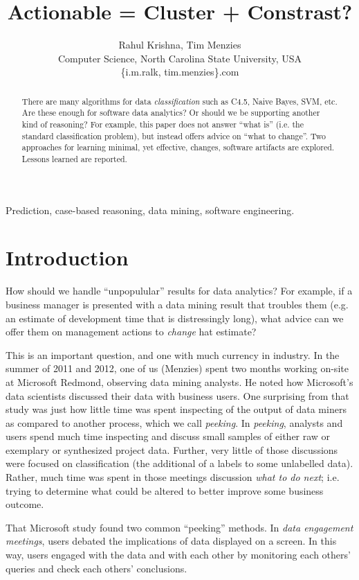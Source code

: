 \documentclass[conference]{IEEEtran}
\title{Actionable = Cluster + Constrast?}
\author{Rahul Krishna, Tim Menzies\\
	Computer Science, North Carolina State University, USA\\
	\{i.m.ralk, tim.menzies\}\@gmail.com
	
}
\begin{document}
	\maketitle
	\begin{abstract}
		There are many
		algorithms for data {\em classification} such as  C4.5, Naive Bayes, SVM, etc.
		Are these enough for software data analytics? Or should we be supporting
		another kind of reasoning? For example, this paper does not answer 
		``what is'' (i.e. the standard classification problem), but instead  offers advice on ``what to change''.
		Two approaches for learning minimal, yet effective,  changes,  software
		artifacts are explored. Lessons learned are reported.
	\end{abstract}
	\begin{IEEEkeywords}
		Prediction, case-based reasoning, data mining, software engineering.
	\end{IEEEkeywords}
	
	\section{Introduction} 
	How should we handle ``unpopulular'' results
	for data analytics? For example, if a business manager is presented
	with a data mining result that troubles them (e.g. an estimate of
	development time that is distressingly long), what advice
	can we offer them on management actions to {\em change} hat estimate?
	
	This is an important question, and one with much currency in industry.
	In the summer of 2011 and 2012, one of us (Menzies) spent two months
	working on-site at Microsoft Redmond,
	observing data mining analysts.  He
	noted how Microsoft's data scientists
	discussed their data with  business users. 
	One surprising from that study was just how
	little time was spent  
	inspecting  of the output of data miners as compared to another process, which we call {\em peeking}.
	In {\em peeking}, analysts and users spend much time
	inspecting and discuss small samples of either raw or exemplary or synthesized project data.  Further, very little of those discussions were  focused on classification
	(the additional of a labels to some unlabelled data). Rather, much time
	was spent in those meetings discussion {\em what to do next}; i.e. trying
	to determine what could be altered to better improve some business outcome.
	
	That   Microsoft  study found two common ``peeking'' methods.
	In {\em data engagement meetings},
	users debated the implications of data
	displayed on a screen. In this way, users
	engaged with the data and with each other by
	monitoring each others' queries and check each others'
	conclusions.
	
\end{document}
